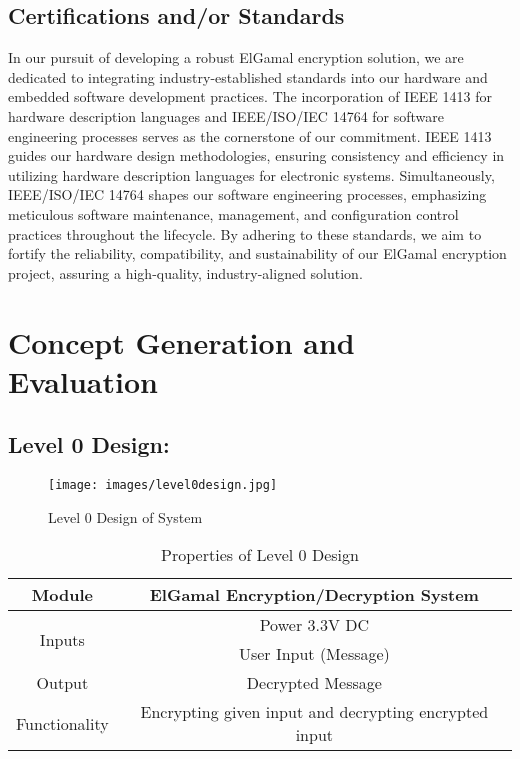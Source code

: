 \documentclass[12pt]{article}
\begin{document}
	\subsection{Certifications and/or Standards}
	In our pursuit of developing a robust ElGamal encryption solution, we are dedicated to integrating industry-established standards into our hardware and embedded software development practices. The incorporation of IEEE 1413 for hardware description languages and IEEE/ISO/IEC 14764 for software engineering processes serves as the cornerstone of our commitment. IEEE 1413 guides our hardware design methodologies, ensuring consistency and efficiency in utilizing hardware description languages for electronic systems. Simultaneously, IEEE/ISO/IEC 14764 shapes our software engineering processes, emphasizing meticulous software maintenance, management, and configuration control practices throughout the lifecycle. By adhering to these standards, we aim to fortify the reliability, compatibility, and sustainability of our ElGamal encryption project, assuring a high-quality, industry-aligned solution.
	\section{Concept Generation and Evaluation}
	
	\subsection{Level 0 Design:}
	\begin{figure}[H]
		\centering
		\label{Level 0 Design of System }
		\texttt{[image: images/level0design.jpg]}\\[0.5 cm]	
		\caption{Level 0 Design of System } 		
	\end{figure}
	\begin{table}[H]
		\centering
		
		\label{Properties Of Level 0 Design }
		\begin{tabular}{|c|c|}
			\hline
			Module & ElGamal Encryption/Decryption System \\ \hline
			\multirow{2}{*}{Inputs} & Power 3.3V DC \\ \cline{2-2}
			& User Input (Message) \\ \hline
			Output & Decrypted Message \\ \hline
			Functionality & Encrypting given input and  decrypting encrypted input \\ \hline
		
		\end{tabular}
		\caption{Properties of Level 0 Design }
	\end{table}
	
\end{document}
